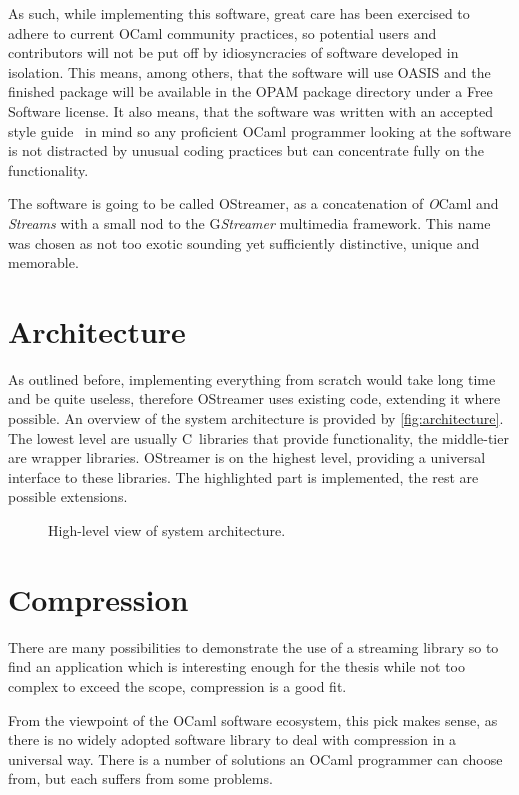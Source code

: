 \documentclass[parskip=half]{scrreprt}
\begin{document}
As such, while implementing this software, great care has been exercised to
adhere to current OCaml community practices, so potential users and
contributors will not be put off by idiosyncracies of software developed in
isolation. This means, among others, that the software will use OASIS and the
finished package will be available in the OPAM package directory under a Free
Software license. It also means, that the software was written with an accepted
style guide~\cite{ocamlstyle} in mind so any proficient OCaml programmer
looking at the software is not distracted by unusual coding practices but can
concentrate fully on the functionality.

The software is going to be called OStreamer, as a concatenation of
\emph{O}Caml and \emph{Streams} with a small nod to the G\emph{Streamer}
multimedia framework. This name was chosen as not too exotic sounding yet
sufficiently distinctive, unique and memorable.

\section{Architecture}
\label{sec:architecture}

As outlined before, implementing everything from scratch would take long time
and be quite useless, therefore OStreamer uses existing code, extending it
where possible. An overview of the system architecture is provided by
\autoref{fig:architecture}. The lowest level are usually C~libraries that
provide functionality, the middle-tier are wrapper libraries. OStreamer is on
the highest level, providing a universal interface to these libraries. The
highlighted part is implemented, the rest are possible extensions.

\begin{figure}[h]
  \centering
  
  \caption{High-level view of system architecture.}
  \label{fig:architecture}
\end{figure}

\section{Compression}
\label{sec:compression}

There are many possibilities to demonstrate the use of a streaming library so
to find an application which is interesting enough for the thesis while not too
complex to exceed the scope, compression is a good fit.

From the viewpoint of the OCaml software ecosystem, this pick makes sense, as
there is no widely adopted software library to deal with compression in a
universal way. There is a number of solutions an OCaml programmer can choose
from, but each suffers from some problems.
\end{document}
